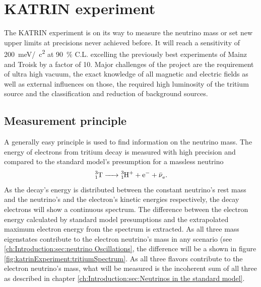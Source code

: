 %

    \chapter{KATRIN experiment}
    \label{ch:The KATRIN experiment}
    The KATRIN experiment is on its way to measure the neutrino mass or set new upper limits at precisions never achieved before. It will reach a sensitivity of \SI{200}{\milli\electronvolt}/\SI{}{\square c} at \SI{90}{\percent} C.L. excelling the previously best experiments of Mainz and Troisk by a factor of \SI{10}{}. Major challenges of the project are the requirement of ultra high vacuum, the exact knowledge of all magnetic and electric fields as well as external influences on those, the required high luminosity of the tritium source and the classification and reduction of background sources.
    
      \section{Measurement principle}
      \label{ch:The KATRIN experiment:sec:Measurement Principle}
      A generally easy principle is used to find information on the neutrino mass. The energy of electrons from tritium decay is measured with high precision and compared to the standard model's presumption for a massless neutrino 
      \begin{equation}
      	\ce{^3_1T -> ^3_1H^+ + e^- + \bar{\nu}_e}.
      \end{equation}
      As the decay's energy is distributed between the constant neutrino's rest mass and the neutrino's and the electron's kinetic energies respectively, the decay electrons will show a continuous spectrum. The difference between the electron energy calculated by standard model presumptions and the extrapolated maximum electron energy from the spectrum is extracted. As all three mass eigenstates contribute to the electron neutrino's mass in any scenario (see \ref{ch:Introduction:sec:neutrino Oscillations}, the difference will be a 
      shown in figure \ref{fig:katrinExperiment:tritiumSpectrum}. As all three flavors contribute to the electron neutrino's mass, what will be measured is the incoherent sum of all three as described in chapter \ref{ch:Introduction:sec:Neutrinos in the standard model}.
      

